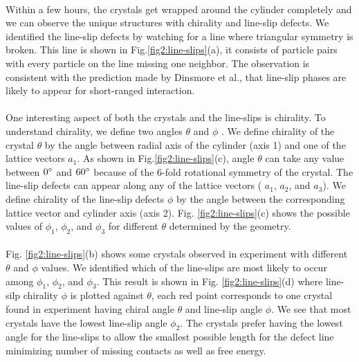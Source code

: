 \documentclass[12pt]{article}
\begin{document}
\paragraph{}
Within a few hours, the crystals get wrapped around the cylinder completely and we can observe the unique structures with chirality and line-slip defects. We identified the line-slip defects by watching for a line where triangular symmetry is broken. This line is shown in Fig.\ref{fig2:line-slips}(a), it consists of particle pairs with every particle on the line missing one neighbor. The observation is consistent with the prediction made by Dinsmore et al.\cite{wood_self-assembly_2013}, that line-slip phases are likely to appear for short-ranged interaction. 

\paragraph{}
One interesting aspect of both the crystals and the line-slips is chirality. To understand chirality, we define two angles $\theta$ and $\phi$ . We define chirality of the crystal $\theta$ by the angle between radial axis of the cylinder (axis 1) and one of the lattice vectors \(a_1\). As shown in Fig.\ref{fig2:line-slips}(c), angle $\theta$ can take any value between $0\degree$ and $60\degree$ because of the 6-fold rotational symmetry of the crystal. The line-slip defects can appear along any of the lattice vectors ( \(a_1\),  \(a_2\), and  \(a_3\)).  We define chirality of the line-slip defects $\phi$ by the angle between the corresponding lattice vector and cylinder axis (axis 2). Fig. \ref{fig2:line-slips}(c) shows the possible values of $\phi_1$, $\phi_2$, and $\phi_3$ for different $\theta$ determined by the geometry. 

\paragraph{}
Fig. \ref{fig2:line-slips}(b) shows some crystals observed in experiment with different $\theta$ and $\phi$ values. We identified which of the line-slips are most likely to occur among $\phi_1$, $\phi_2$, and $\phi_3$. This result is shown in Fig. \ref{fig2:line-slips}(d) where line-silp chirality $\phi$ is plotted against $\theta$, each red point corresponds to one crystal found in experiment having chiral angle $\theta$ and line-slip angle $\phi$. We see that most crystals have the lowest line-slip angle $\phi_2$. The crystals prefer having the lowest angle for the line-slips to allow the smallest possible length for the defect line minimizing number of missing contacts as well as free energy. 
\end{document}
